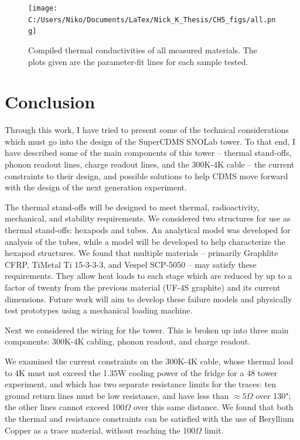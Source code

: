 \documentclass{report}
\begin{document}
\begin{figure}[h]
\centering
\texttt{[image: C:/Users/Niko/Documents/LaTex/Nick\_K\_Thesis/CH5\_figs/all.png]}
\caption{Compiled thermal conductivities of all measured materials. The plots given are the parameter-fit lines for each sample tested.}
\end{figure}

\section*{Conclusion}

Through this work, I have tried to present some of the technical considerations which must go into the design of the SuperCDMS SNOLab tower. To that end, I have described some of the main components of this tower -- thermal stand-offs, phonon readout lines, charge readout lines, and the 300K-4K cable -- the current constraints to their design, and possible solutions to help CDMS move forward with the design of the next generation experiment.

The thermal stand-offs will be designed to meet thermal, radioactivity, mechanical, and stability requirements. We considered two structures for use as thermal stand-offs: hexapods and tubes. An analytical model was developed for analysis of the tubes, while a model will be developed to help characterize the hexapod structures. We found that multiple materials -- primarily Graphlite CFRP, TiMetal Ti 15-3-3-3, and Vespel SCP-5050 -- may satisfy these requirements. They allow heat loads to each stage which are reduced by up to a factor of twenty from the previous material (UF-4S graphite) and its current dimensions. Future work will aim to develop these failure models and physically test prototypes using a mechanical loading machine.

Next we considered the wiring for the tower. This is broken up into three main components: 300K-4K cabling, phonon readout, and charge readout. 

We examined the current constraints on the 300K-4K cable, whose thermal load to 4K must not exceed the 1.35W cooling power of the fridge for a 48 tower experiment, and which has two separate resistance limits for the traces: ten ground return lines must be low resistance, and have less than $\approx 5 \Omega$ over 130"; the other lines cannot exceed 100$\Omega$ over this same distance. We found that both the thermal and resistance constraints can be satisfied with the use of Beryllium Copper as a trace material, without reaching the 100$\Omega$ limit.
\end{document}
